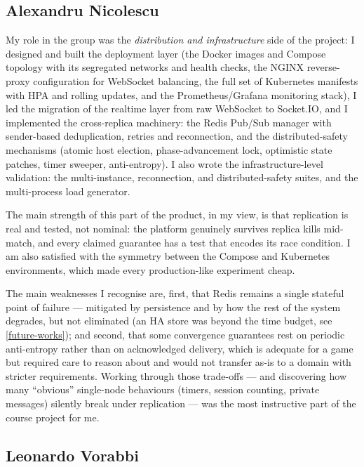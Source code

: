 \documentclass{scrartcl}
\begin{document}

\subsection{Alexandru Nicolescu}

My role in the group was the \emph{distribution and infrastructure} side
of the project: I designed and built the deployment layer (the Docker
images and Compose topology with its segregated networks and health
checks, the NGINX reverse-proxy configuration for WebSocket balancing,
the full set of Kubernetes manifests with HPA and rolling updates, and
the Prometheus/Grafana monitoring stack), I led the migration of the
realtime layer from raw WebSocket to Socket.IO, and I implemented the
cross-replica machinery: the Redis Pub/Sub manager with sender-based
deduplication, retries and reconnection, and the distributed-safety
mechanisms (atomic host election, phase-advancement lock, optimistic
state patches, timer sweeper, anti-entropy). I also wrote the
infrastructure-level validation: the multi-instance, reconnection, and
distributed-safety suites, and the multi-process load generator.

The main strength of this part of the product, in my view, is that
replication is real and tested, not nominal: the platform genuinely
survives replica kills mid-match, and every claimed guarantee has a test
that encodes its race condition. I am also satisfied with the symmetry
between the Compose and Kubernetes environments, which made every
production-like experiment cheap.

The main weaknesses I recognise are, first, that Redis remains a single
stateful point of failure --- mitigated by persistence and by how the rest
of the system degrades, but not eliminated (an HA store was beyond the
time budget, see \cref{future-works}); and second, that some
convergence guarantees rest on periodic anti-entropy rather than on
acknowledged delivery, which is adequate for a game but required care to
reason about and would not transfer as-is to a domain with stricter
requirements. Working through those trade-offs --- and discovering how
many ``obvious'' single-node behaviours (timers, session counting,
private messages) silently break under replication --- was the most
instructive part of the course project for me.

\subsection{Leonardo Vorabbi}
\end{document}
